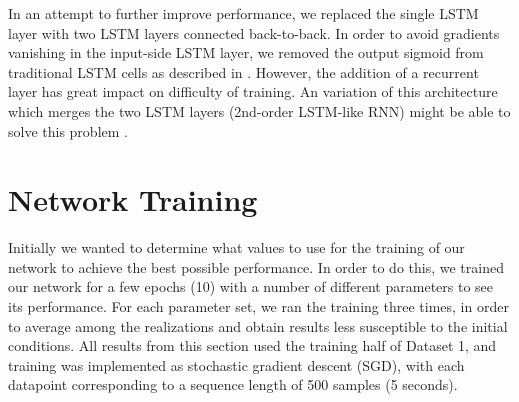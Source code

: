 \documentclass{acm_proc_article-sp}
\begin{document}
In an attempt to further improve performance, we replaced the single LSTM layer with two LSTM layers connected back-to-back. In order to avoid gradients vanishing in the input-side LSTM layer, we removed the output sigmoid from traditional LSTM cells as described in \cite{Gers2002}. However, the addition of a recurrent layer has great impact on difficulty of training. An variation of this architecture which merges the two LSTM layers (2nd-order LSTM-like RNN) might be able to solve this problem \cite{Monner2012}.

\section{Network Training}
\label{sec:Network Training}

Initially we wanted to determine what values to use for the training of our network to achieve the best possible performance. In order to do this, we trained our network for a few epochs (10) with a  number of different parameters to see its performance.
For each parameter set, we ran the training three times, in order to average among the realizations and obtain results less susceptible to the initial conditions.
All results from this section used the training half of Dataset 1, and training was implemented as stochastic gradient descent (SGD), with each datapoint corresponding to a sequence length of 500 samples (5 seconds).
\end{document}
